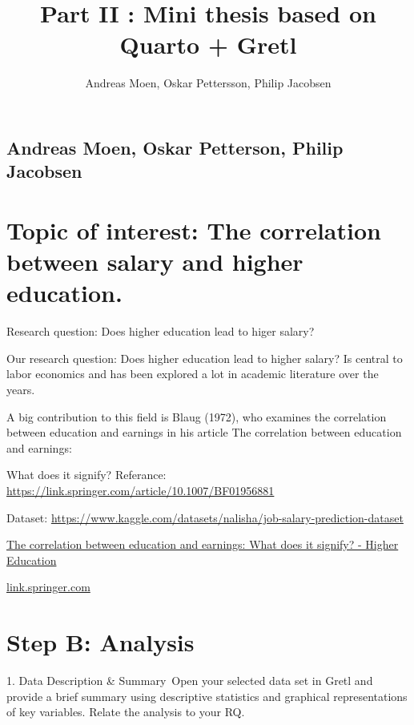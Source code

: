 \documentclass[
  letterpaper,
  DIV=11,
  numbers=noendperiod]{scrartcl}
\title{Part II : Mini thesis based on Quarto + Gretl}
\author{Andreas Moen, Oskar Pettersson, Philip Jacobsen}
\date{}
\renewcommand*\contentsname{Table of contents}
\newcommand\contentsname{Table of contents}
\begin{document}
\maketitle

\renewcommand*\contentsname{Table of contents}
{
\setcounter{tocdepth}{3}
\tableofcontents
}
\listoffigures
\listoftables

\subsection{Andreas Moen, Oskar Petterson, Philip
Jacobsen~}\label{andreas-moen-oskar-petterson-philip-jacobsen}

\section{Topic of interest: The correlation between salary and higher
education.~}\label{topic-of-interest-the-correlation-between-salary-and-higher-education.}

Research question: Does higher education lead to higer salary?~~

Our research question: Does higher education lead to higher salary? Is
central to labor economics and has been explored a lot in academic
literature over the years.~~

A big contribution to this field is Blaug (1972), who examines the
correlation between education and earnings in his article The
correlation between education and earnings:~

What does it signify? Referance:
\url{https://link.springer.com/article/10.1007/BF01956881}~~

Dataset:
\url{https://www.kaggle.com/datasets/nalisha/job-salary-prediction-dataset}~

\href{https://link.springer.com/article/10.1007/BF01956881}{The
correlation between education and earnings: What does it signify? -
Higher Education}~

\href{https://link.springer.com/article/10.1007/BF01956881}{link.springer.com}~

\section{Step B: Analysis~}\label{step-b-analysis}

1. Data Description \& Summary~Open your selected data set in Gretl and
provide a brief summary using descriptive statistics and graphical
representations of key variables. Relate the analysis to your RQ.
\end{document}
